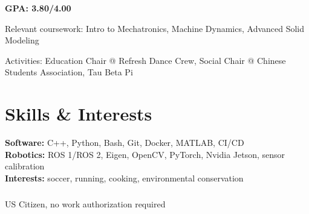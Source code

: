 \documentclass{resume}
\begin{document}
\begin{details}
  \item \textbf{GPA: 3.80/4.00}
  \item Relevant coursework: Intro to Mechatronics, Machine Dynamics, Advanced Solid Modeling
  \item Activities: Education Chair @ Refresh Dance Crew, Social Chair @ Chinese Students Association, Tau
  Beta Pi
\end{details}

\section{Skills \& Interests}
\textbf{Software:} C++, Python, Bash, Git, Docker, MATLAB, CI/CD \\
\textbf{Robotics:} ROS 1/ROS 2, Eigen, OpenCV, PyTorch, Nvidia Jetson, sensor calibration \\
\textbf{Interests:} soccer, running, cooking, environmental conservation \\~\\

\textsuperscript{\textasteriskcentered} US Citizen, no work authorization required
\end{document}
